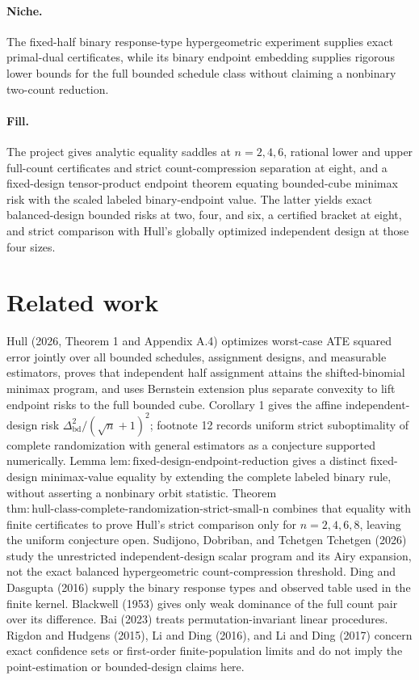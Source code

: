 \documentclass{article}
\begin{document}
\paragraph{Niche.} The fixed-half binary response-type hypergeometric experiment supplies exact primal-dual certificates, while its binary endpoint embedding supplies rigorous lower bounds for the full bounded schedule class without claiming a nonbinary two-count reduction.

\paragraph{Fill.} The project gives analytic equality saddles at \(n=2,4,6\), rational lower and upper full-count certificates and strict count-compression separation at eight, and a fixed-design tensor-product endpoint theorem equating bounded-cube minimax risk with the scaled labeled binary-endpoint value. The latter yields exact balanced-design bounded risks at two, four, and six, a certified bracket at eight, and strict comparison with Hull's globally optimized independent design at those four sizes.

\section{Related work}

Hull (2026, Theorem 1 and Appendix A.4) optimizes worst-case ATE squared error jointly over all bounded schedules, assignment designs, and measurable estimators, proves that independent half assignment attains the shifted-binomial minimax program, and uses Bernstein extension plus separate convexity to lift endpoint risks to the full bounded cube. Corollary 1 gives the affine independent-design risk \(\Delta_{\mathrm{bd}}^2/(\sqrt n+1)^2\); footnote 12 records uniform strict suboptimality of complete randomization with general estimators as a conjecture supported numerically. Lemma \(\mathrm{lem{:}fixed\mbox{-}design\mbox{-}endpoint\mbox{-}reduction}\) gives a distinct fixed-design minimax-value equality by extending the complete labeled binary rule, without asserting a nonbinary orbit statistic. Theorem \(\mathrm{thm{:}hull\mbox{-}class\mbox{-}complete\mbox{-}randomization\mbox{-}strict\mbox{-}small\mbox{-}n}\) combines that equality with finite certificates to prove Hull's strict comparison only for \(n=2,4,6,8\), leaving the uniform conjecture open. Sudijono, Dobriban, and Tchetgen Tchetgen (2026) study the unrestricted independent-design scalar program and its Airy expansion, not the exact balanced hypergeometric count-compression threshold. Ding and Dasgupta (2016) supply the binary response types and observed table used in the finite kernel. Blackwell (1953) gives only weak dominance of the full count pair over its difference. Bai (2023) treats permutation-invariant linear procedures. Rigdon and Hudgens (2015), Li and Ding (2016), and Li and Ding (2017) concern exact confidence sets or first-order finite-population limits and do not imply the point-estimation or bounded-design claims here.
\end{document}
